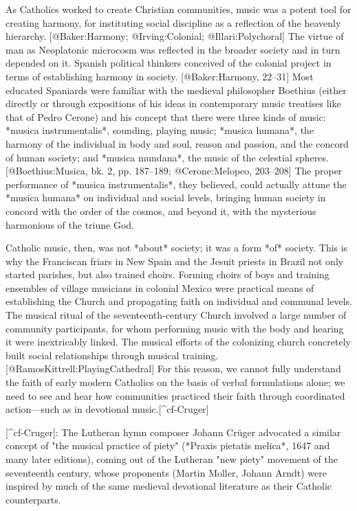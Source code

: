 As Catholics worked to create Christian communities, music was a potent tool for
creating harmony, for instituting social discipline as a reflection of the
heavenly hierarchy.
[@Baker:Harmony; @Irving:Colonial; @Illari:Polychoral]
The virtue of man as Neoplatonic microcosm was reflected in the broader society
and in turn depended on it.
Spanish political thinkers conceived of the colonial project in terms of
establishing harmony in society.
[@Baker:Harmony, 22--31] 
Most educated Spaniards were familiar with the medieval philosopher Boethius
(either directly or through expositions of his ideas in contemporary music
treatises like that of Pedro Cerone) and his concept that there were three kinds
of music: *musica instrumentalis*, sounding, playing music; *musica humana*, the
harmony of the individual in body and soul, reason and passion, and the concord
of human society; and *musica mundana*, the music of the celestial spheres.
[@Boethius:Musica, bk. 2, pp. 187--189; @Cerone:Melopeo, 203--208]
The proper performance of *musica instrumentalis*, they believed, could actually
attune the *musica humana* on individual and social levels, bringing human
society in concord with the order of the cosmos, and beyond it, with the
mysterious harmonious of the triune God.

Catholic music, then, was not *about* society; it was a form *of* society. 
This is why the Franciscan friars in New Spain and the Jesuit priests in Brazil
not only started parishes, but also trained choirs. 
Forming choirs of boys and training ensembles of village musicians in colonial
Mexico were practical means of establishing the Church and propagating faith on
individual and communal levels. 
The musical ritual of the seventeenth-century Church involved a large number of
community participants, for whom performing music with the body and hearing it
were inextricably linked. 
The musical efforts of the colonizing church concretely built social
relationships through musical training.
[@RamosKittrell:PlayingCathedral]
For this reason, we cannot fully understand the faith of early modern Catholics
on the basis of verbal formulations alone; we need to see and hear how
communities practiced their faith through coordinated action---such as in
devotional music.[^cf-Cruger]

[^cf-Cruger]: 
The Lutheran hymn composer Johann Crüger advocated a similar concept of "the
musical practice of piety" (*Praxis pietatis melica*, 1647 and many later
editions), coming out of the Lutheran "new piety" movement of the seventeenth
century, whose proponents (Martin Moller, Johann Arndt) were inspired by much of
the same medieval devotional literature as their Catholic counterparts. 

